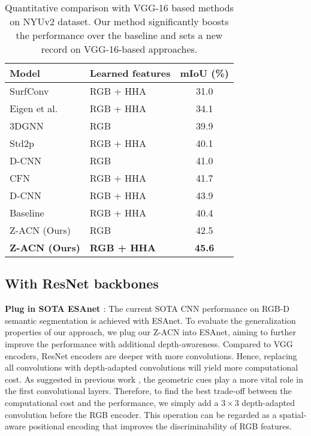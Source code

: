 \documentclass[lettersize,journal]{IEEEtran}
\begin{document}
\begin{table}[t]
\centering
\caption{Quantitative comparison with VGG-16 based methods on NYUv2 dataset. Our method significantly boosts the performance over the baseline and sets a new record on VGG-16-based approaches.}

\begin{tabular}[ht]{p{2cm} | p{2.3cm} c} 
\hline

\hline
Model & Learned features & mIoU (\%)  \\
\hline
SurfConv \cite{chu2018surfconv} & RGB + HHA  & 31.0  \\ 
\hline
Eigen et al. \cite{Eigen2015MultiScale} & RGB + HHA & 34.1  \\ 
\hline
3DGNN \cite{Qi2017Graph} & RGB & 39.9  \\ 
\hline
Std2p \cite{he2017std2p} & RGB + HHA & 40.1 \\
\hline
D-CNN \cite{Wang2018DCNN}& RGB & 41.0  \\
\hline
CFN \cite{Lin2017RGBDCascaded} & RGB + HHA & 41.7  \\
\hline
D-CNN \cite{Wang2018DCNN}& RGB + HHA  & 43.9  \\
\hline
\hline
Baseline & RGB + HHA & 40.4 \\
\hline
Z-ACN (Ours)& RGB & 42.5  \\
\hline
\textbf{Z-ACN (Ours)} & \textbf{RGB + HHA } & \textbf{45.6}  \\
\hline

\hline
\end{tabular}

\label{pretrained}
\end{table}


\subsection{With ResNet backbones} 
\textbf{Plug in SOTA ESAnet \cite{esanet2021icra}}: The current SOTA CNN performance on RGB-D semantic segmentation is achieved with ESAnet. To evaluate the generalization properties of our approach, we plug our Z-ACN into ESAnet, aiming to further improve the performance with additional depth-awareness. Compared to VGG encoders, ResNet encoders are deeper with more convolutions. Hence, replacing all convolutions with depth-adapted convolutions will yield more computational cost. As suggested in previous work \cite{omniflow,shi2022panoflow}, the geometric cues play a more vital role in the first convolutional layers. Therefore, to find the best trade-off between the computational cost and the performance, we simply add a $3 \times 3$ depth-adapted convolution before the RGB encoder. This operation can be regarded as a spatial-aware positional encoding that improves the discriminability of RGB features. 
\end{document}
